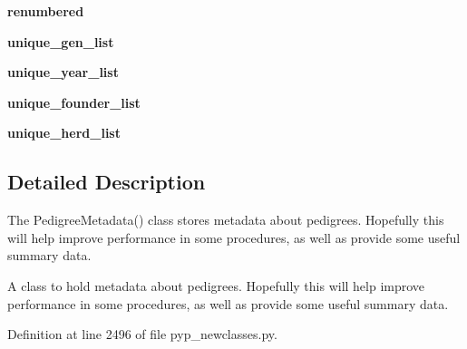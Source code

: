 \begin{DoxyCompactItemize}
\item 
\hypertarget{classPyPedal_1_1pyp__newclasses_1_1PedigreeMetadata_a438e394237da437693a667f01bf17500}{
{\bfseries renumbered}}
\label{classPyPedal_1_1pyp__newclasses_1_1PedigreeMetadata_a438e394237da437693a667f01bf17500}

\item 
\hypertarget{classPyPedal_1_1pyp__newclasses_1_1PedigreeMetadata_a12189226c48c79f6256be356927595b6}{
{\bfseries unique\_\-gen\_\-list}}
\label{classPyPedal_1_1pyp__newclasses_1_1PedigreeMetadata_a12189226c48c79f6256be356927595b6}

\item 
\hypertarget{classPyPedal_1_1pyp__newclasses_1_1PedigreeMetadata_a9006f241d87025dc5035be307d2173ab}{
{\bfseries unique\_\-year\_\-list}}
\label{classPyPedal_1_1pyp__newclasses_1_1PedigreeMetadata_a9006f241d87025dc5035be307d2173ab}

\item 
\hypertarget{classPyPedal_1_1pyp__newclasses_1_1PedigreeMetadata_a8d1484c36529a6a2dc85e1562540d4dc}{
{\bfseries unique\_\-founder\_\-list}}
\label{classPyPedal_1_1pyp__newclasses_1_1PedigreeMetadata_a8d1484c36529a6a2dc85e1562540d4dc}

\item 
\hypertarget{classPyPedal_1_1pyp__newclasses_1_1PedigreeMetadata_a91b610d629df6c79f8adc7605af72541}{
{\bfseries unique\_\-herd\_\-list}}
\label{classPyPedal_1_1pyp__newclasses_1_1PedigreeMetadata_a91b610d629df6c79f8adc7605af72541}

\end{DoxyCompactItemize}


\subsection{Detailed Description}
The PedigreeMetadata() class stores metadata about pedigrees. Hopefully this will help improve performance in some procedures, as well as provide some useful summary data. \begin{DoxyVerb}A class to hold metadata about pedigrees.  Hopefully this will help improve performance in some procedures, as well as
provide some useful summary data.\end{DoxyVerb}
 

Definition at line 2496 of file pyp\_\-newclasses.py.



